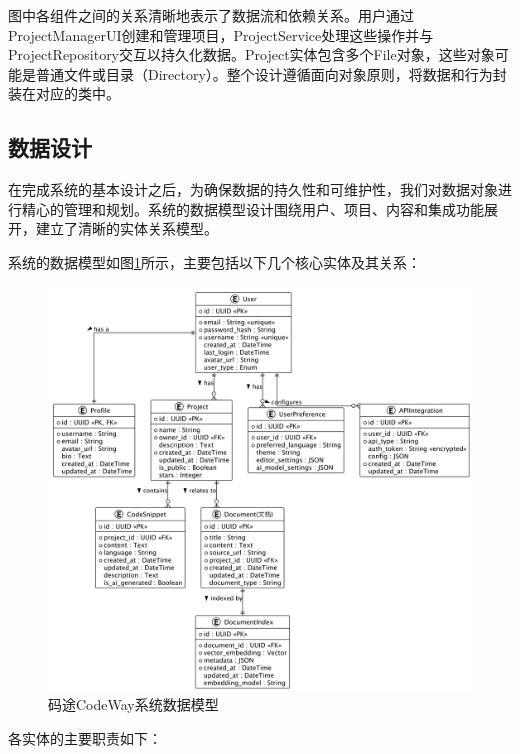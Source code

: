 \documentclass[
    report,     %
    oneside,    %
    UTF8,       %
    zihao=-4    %
]{config} %
\begin{document}
图中各组件之间的关系清晰地表示了数据流和依赖关系。用户通过ProjectManagerUI创建和管理项目，ProjectService处理这些操作并与ProjectRepository交互以持久化数据。Project实体包含多个File对象，这些对象可能是普通文件或目录（Directory）。整个设计遵循面向对象原则，将数据和行为封装在对应的类中。
\subsection{数据设计}

在完成系统的基本设计之后，为确保数据的持久性和可维护性，我们对数据对象进行精心的管理和规划。系统的数据模型设计围绕用户、项目、内容和集成功能展开，建立了清晰的实体关系模型。

系统的数据模型如图\ref{fig:data-model}所示，主要包括以下几个核心实体及其关系：

\begin{figure}[H]
    \centering
    \includegraphics[width=1.0\textwidth]{UML/DataModel.png}
    \caption{码途CodeWay系统数据模型}
    \label{fig:data-model}
\end{figure}

各实体的主要职责如下：
\end{document}
